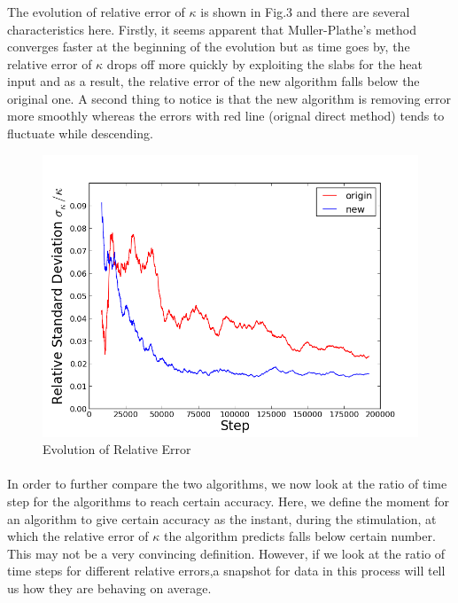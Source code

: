 \documentclass[twocolumn]{article}
\begin{document}
\subsubsection*{}
\paragraph*{}
The evolution of relative error of $\kappa$ is shown in Fig.3 and there are several characteristics here. Firstly, it seems apparent that Muller-Plathe's method converges faster at the beginning of the evolution but as time goes by, the relative error of $\kappa$ drops off more quickly by exploiting the slabs for the heat input and as a result, the relative error of the new algorithm falls below the original one. A second thing to notice is that the new algorithm is removing error more smoothly whereas the errors with red line (orignal direct method) tends to fluctuate while descending.
\begin{figure}[h] %
\centering
\includegraphics[width=\linewidth]{RelativeError.png}
\caption{Evolution of Relative Error}
\end{figure}
\paragraph*{}
In order to further compare the two algorithms, we now look at the ratio of time step for the algorithms to reach certain accuracy. Here, we define the moment for an algorithm to give certain accuracy as the instant, during the stimulation, at which the relative error of $\kappa$ the algorithm predicts falls below certain number. This may not be a very convincing definition. However, if we look at the ratio of time steps for different relative errors,a snapshot for data in this process will tell us how they are behaving on average.
\end{document}
